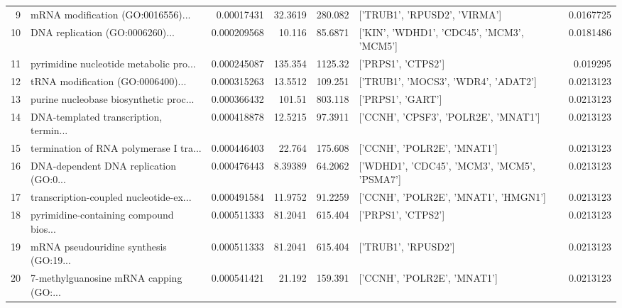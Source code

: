 \documentclass{article}
\begin{document}
\begin{table}[h]
\begin{tabular}{rlrrrlr}
      9 & mRNA modification (GO:0016556)...      & 0.00017431  &  32.3619  &         280.082  & ['TRUB1', 'RPUSD2', 'VIRMA']                                                    &  0.0167725  \\
     10 & DNA replication (GO:0006260)...        & 0.000209568 &  10.116   &          85.6871 & ['KIN', 'WDHD1', 'CDC45', 'MCM3', 'MCM5']                                       &  0.0181486  \\
     11 & pyrimidine nucleotide metabolic pro... & 0.000245087 & 135.354   &        1125.32   & ['PRPS1', 'CTPS2']                                                              &  0.019295   \\
     12 & tRNA modification (GO:0006400)...      & 0.000315263 &  13.5512  &         109.251  & ['TRUB1', 'MOCS3', 'WDR4', 'ADAT2']                                             &  0.0213123  \\
     13 & purine nucleobase biosynthetic proc... & 0.000366432 & 101.51    &         803.118  & ['PRPS1', 'GART']                                                               &  0.0213123  \\
     14 & DNA-templated transcription, termin... & 0.000418878 &  12.5215  &          97.3911 & ['CCNH', 'CPSF3', 'POLR2E', 'MNAT1']                                            &  0.0213123  \\
     15 & termination of RNA polymerase I tra... & 0.000446403 &  22.764   &         175.608  & ['CCNH', 'POLR2E', 'MNAT1']                                                     &  0.0213123  \\
     16 & DNA-dependent DNA replication (GO:0... & 0.000476443 &   8.39389 &          64.2062 & ['WDHD1', 'CDC45', 'MCM3', 'MCM5', 'PSMA7']                                     &  0.0213123  \\
     17 & transcription-coupled nucleotide-ex... & 0.000491584 &  11.9752  &          91.2259 & ['CCNH', 'POLR2E', 'MNAT1', 'HMGN1']                                            &  0.0213123  \\
     18 & pyrimidine-containing compound bios... & 0.000511333 &  81.2041  &         615.404  & ['PRPS1', 'CTPS2']                                                              &  0.0213123  \\
     19 & mRNA pseudouridine synthesis (GO:19... & 0.000511333 &  81.2041  &         615.404  & ['TRUB1', 'RPUSD2']                                                             &  0.0213123  \\
     20 & 7-methylguanosine mRNA capping (GO:... & 0.000541421 &  21.192   &         159.391  & ['CCNH', 'POLR2E', 'MNAT1']                                                     &  0.0213123  \\
\hline
\end{tabular}
\end{table}
\end{document}
